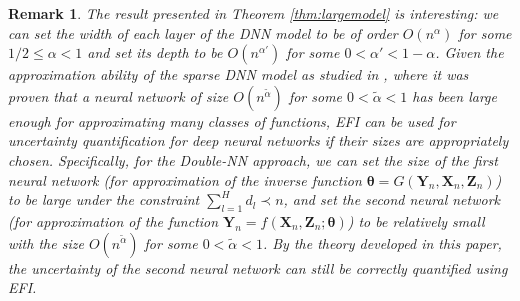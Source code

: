 \documentclass[11pt]{article}
\newcommand{\bX}{{\boldsymbol X}}
\newcommand{\bY}{{\boldsymbol Y}}
\newcommand{\bx}{{\boldsymbol x}}
\newcommand{\bZ}{{\boldsymbol Z}}
\newcommand{\bbeta}{{\boldsymbol \beta}}
\newcommand{\btheta}{{\boldsymbol \theta}}
\newtheorem{remark}{Remark}
\begin{document}
\begin{remark}
The result presented in Theorem \ref{thm:largemodel} is interesting: we can set the width of each layer of the DNN model to be of order $O(n^{\alpha})$ for some $1/2\leq \alpha<1$ 
and set its depth to be $O(n^{\alpha'})$ for some $0<\alpha'<1-\alpha$. Given the approximation ability of the sparse DNN model as studied in \cite{SunSLiang2021}, where it was proven that a neural network of size $O(n^{\tilde{\alpha}})$ 
for some $0<\tilde{\alpha}<1$ has been large enough for approximating many classes 
of functions, 
EFI can be used for uncertainty quantification for 
deep neural networks if their sizes are appropriately chosen. 
Specifically, for the Double-NN approach, we can set the size of the first neural network (for approximation of the inverse function $\btheta=G(\bY_n,\bX_n,\bZ_n)$) 
to be large under the constraint $\sum_{l=1}^H d_l \prec n$, and set the second
neural network (for approximation of the function $\bY_n=f(\bX_n,\bZ_n;\btheta)$) 
to be relatively small with the size $O(n^{\tilde{\alpha}})$ for some 
$0< \tilde{\alpha} <1$. By the theory developed in this paper, the uncertainty of the second neural network can still be correctly quantified using EFI. 
\end{remark} 




\end{document}
